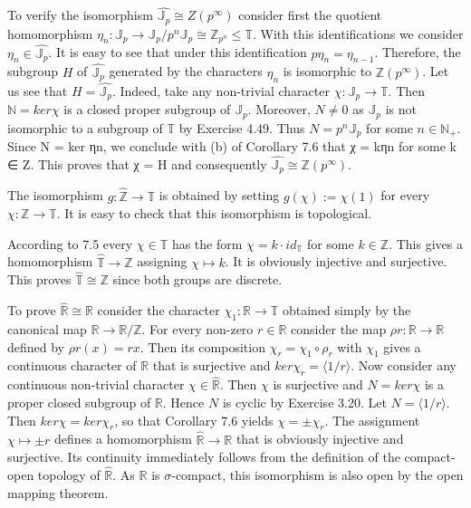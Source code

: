 \documentclass[12pt]{article}
\begin{document}
    To verify the isomorphism $\hat{\mathbb{J}_p} \cong Z(p^{\infty})$ consider first the quotient homomorphism $\eta_n : \mathbb{J}_p \to \mathbb{J}_p / p^n \mathbb{J}_p\cong \mathbb{Z}_{p^n} \leq \mathbb{T}$.
With this identifications we consider $\eta_n \in \hat{\mathbb{J}_p}$. It is easy to see that under this identification $p\eta_n = \eta_{n-1}$.
Therefore, the subgroup $H$ of $\hat{\mathbb{J}_p}$ generated by the characters $\eta_n$ is isomorphic to $\mathbb{Z}(p^\infty)$. Let us see that $H = \hat{\mathbb{J}_p}$.
Indeed, take any non-trivial character $\chi : \mathbb{J}_p \to \mathbb{T}$. Then $\mathbb{N} = ker \chi$ is a closed proper subgroup of $\mathbb{J}_p$. Moreover,
$N \neq 0$ as $\mathbb{J}_p$ is not isomorphic to a subgroup of $\mathbb{T}$ by Exercise 4.49. Thus $N = p^n \mathbb{J}_p$ for some $n \in \mathbb{N}_+$. Since
N = ker ηn, we conclude with (b) of Corollary 7.6 that χ = kηn for some k ∈ Z. This proves that χ = H and
consequently $\hat{\mathbb{J}_p} \cong \mathbb{Z}(p^{\infty})$.


    The isomorphism $g : \mathbb{\hat{Z}} \to \mathbb{T}$ is obtained by setting $g(\chi) := \chi(1)$ for every $\chi : \mathbb{Z} \to \mathbb{T}$. It is easy to check that
this isomorphism is topological.


    According to 7.5 every $\chi \in \mathbb{T}$ has the form $\chi = k · id_{\mathbb{T}}$ for some $k \in \mathbb{Z}$. This gives a homomorphism $\hat{\mathbb{T}} \to \mathbb{Z}$
assigning $\chi \mapsto k$. It is obviously injective and surjective. This proves $\hat{\mathbb{T}} \cong \mathbb{Z}$ since both groups are discrete.


    To prove $\hat{\mathbb{R}} \cong \mathbb{R}$ consider the character $\chi_1 : \mathbb{R} \to \mathbb{T}$ obtained simply by the canonical map $\mathbb{R} \to \mathbb{R} / \mathbb{Z}$. For
every non-zero $r \in \mathbb{R}$ consider the map $\rho r : \mathbb{R} \to \mathbb{R}$ defined by $\rho r(x) = rx$. Then its composition $\chi_r = \chi_1 \circ \rho_r$
with $\chi_1$ gives a continuous character of $\mathbb{R}$ that is surjective and $ker \chi_r = \langle 1/r \rangle$. Now consider any continuous
non-trivial character $\chi \in \hat{\mathbb{R}}$. Then $\chi$ is surjective and $N = ker \chi$ is a proper closed subgroup of $\mathbb{R}$. Hence $N$
is cyclic by Exercise 3.20. Let $N = \langle 1/r \rangle$. Then $ker \chi = ker \chi_r$, so that Corollary 7.6 yields $\chi = \pm \chi_r$. The
assignment $\chi \mapsto \pm r$ defines a homomorphism $\hat{\mathbb{R}} \to \mathbb{R}$ that is obviously injective and surjective. Its continuity
immediately follows from the definition of the compact-open topology of $\hat{\mathbb{R}}$. As $\mathbb{R}$ is $\sigma$-compact, this isomorphism
is also open by the open mapping theorem.
\end{document}
